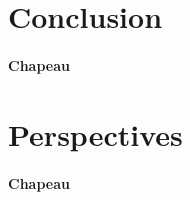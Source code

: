 \section*{Conclusion} \label{sec:conclusion}

\paragraph{Chapeau}


\section*{Perspectives} \label{sec:perspectives}

\paragraph{Chapeau}
